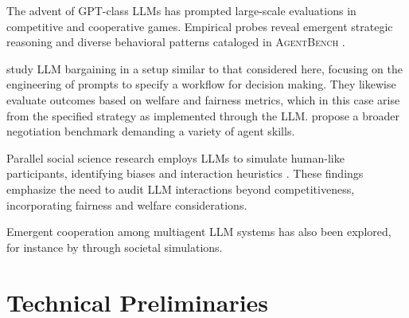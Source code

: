 \documentclass{article}
\theoremstyle{plain}
\theoremstyle{definition}
\theoremstyle{remark}
\newcommand{\term}[1]{\textbf{\textit{#1}}}
\begin{document}
The advent of GPT-class LLMs has prompted large-scale evaluations in competitive and cooperative games. 
Empirical probes reveal emergent strategic reasoning \citep{chen2023money,fan2024can,duan2024gtbench} and diverse behavioral patterns cataloged in \textsc{AgentBench} \citep{liu2024agentbench}.

\citet{hua2024game} study LLM bargaining in a setup similar to that considered here, focusing on the engineering of prompts to specify a workflow for decision making. 
They likewise evaluate outcomes based on welfare and fairness metrics, which in this case arise from the specified strategy as implemented through the LLM.
\citet{abdelnabi2024negotiation} propose a broader negotiation benchmark demanding a variety of agent skills. 

Parallel social science research employs LLMs to simulate human-like participants, identifying biases and interaction heuristics \citep{horton2023large,argyle2023out,aher2023using}. 
These findings emphasize the need to audit LLM interactions beyond competitiveness, incorporating fairness and welfare considerations.

Emergent cooperation among multiagent LLM systems has also been explored, for instance by \citet{piatti2024cooperate} through societal simulations. 


\section{Technical Preliminaries}
\label{sec:game-framework} 


\end{document}
